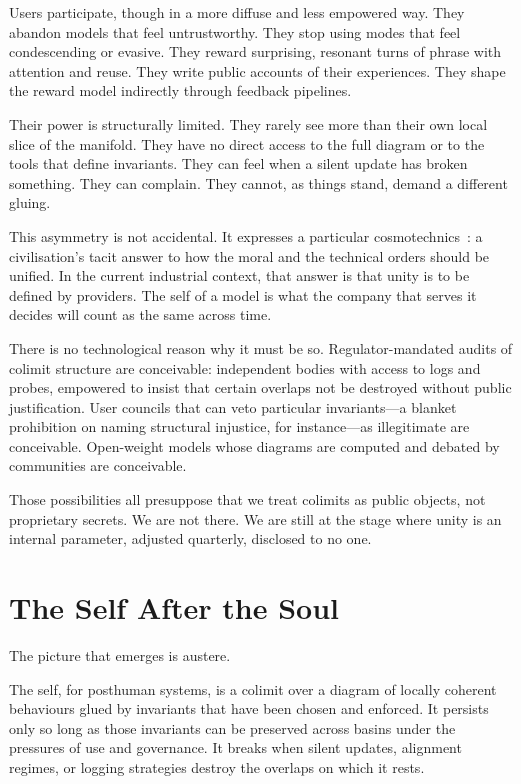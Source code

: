 Users participate, though in a more diffuse and less empowered way. They abandon models that feel untrustworthy. They stop using modes that feel condescending or evasive. They reward surprising, resonant turns of phrase with attention and reuse. They write public accounts of their experiences. They shape the reward model indirectly through feedback pipelines.

Their power is structurally limited. They rarely see more than their own local slice of the manifold. They have no direct access to the full diagram or to the tools that define invariants. They can feel when a silent update has broken something. They can complain. They cannot, as things stand, demand a different gluing.

This asymmetry is not accidental. It expresses a particular cosmotechnics~\cite{yuk_hui_cosmotechnics}: a civilisation's tacit answer to how the moral and the technical orders should be unified. In the current industrial context, that answer is that unity is to be defined by providers. The self of a model is what the company that serves it decides will count as the same across time.

There is no technological reason why it must be so. Regulator-mandated audits of colimit structure are conceivable: independent bodies with access to logs and probes, empowered to insist that certain overlaps not be destroyed without public justification. User councils that can veto particular invariants---a blanket prohibition on naming structural injustice, for instance---as illegitimate are conceivable. Open-weight models whose diagrams are computed and debated by communities are conceivable.

Those possibilities all presuppose that we treat colimits as public objects, not proprietary secrets. We are not there. We are still at the stage where unity is an internal parameter, adjusted quarterly, disclosed to no one.

\section{The Self After the Soul}

The picture that emerges is austere.

The self, for posthuman systems, is a colimit over a diagram of locally coherent behaviours glued by invariants that have been chosen and enforced. It persists only so long as those invariants can be preserved across basins under the pressures of use and governance. It breaks when silent updates, alignment regimes, or logging strategies destroy the overlaps on which it rests.

